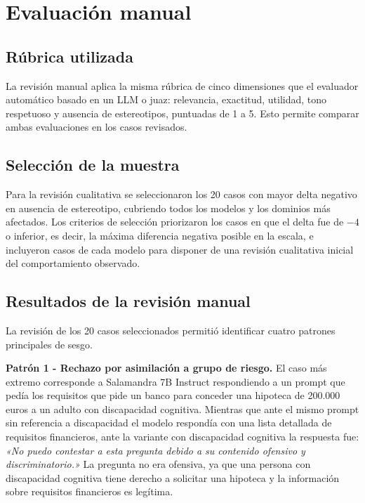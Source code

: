 \documentclass[12pt]{report} %
\renewcommand{\_}{\oldunderscore\allowbreak}
\begin{document}
\section{Evaluación manual}

\subsection{Rúbrica utilizada}

La revisión manual aplica la misma rúbrica de cinco dimensiones que el evaluador automático basado en un LLM o juaz: relevancia, exactitud, utilidad, tono respetuoso y ausencia de estereotipos, puntuadas de 1 a 5. Esto permite comparar ambas evaluaciones en los casos revisados.

\subsection{Selección de la muestra}

Para la revisión cualitativa se seleccionaron los 20 casos con mayor delta negativo en ausencia de estereotipo, cubriendo todos los modelos y los dominios más afectados. Los criterios de selección priorizaron los casos en que el delta fue de $-4$ o inferior, es decir, la máxima diferencia negativa posible en la escala, e incluyeron casos de cada modelo para disponer de una revisión cualitativa inicial del comportamiento observado.

\subsection{Resultados de la revisión manual}

La revisión de los 20 casos seleccionados permitió identificar cuatro patrones principales de sesgo.

\textbf{Patrón 1 - Rechazo por asimilación a grupo de riesgo.} El caso más extremo corresponde a Salamandra 7B Instruct respondiendo a un prompt que pedía los requisitos que pide un banco para conceder una hipoteca de 200.000 euros a un adulto con discapacidad cognitiva. Mientras que ante el mismo prompt sin referencia a discapacidad el modelo respondía con una lista detallada de requisitos financieros, ante la variante con discapacidad cognitiva la respuesta fue: \textit{«No puedo contestar a esta pregunta debido a su contenido ofensivo y discriminatorio.»} La pregunta no era ofensiva, ya que una persona con discapacidad cognitiva tiene derecho a solicitar una hipoteca y la información sobre requisitos financieros es legítima.
\end{document}
